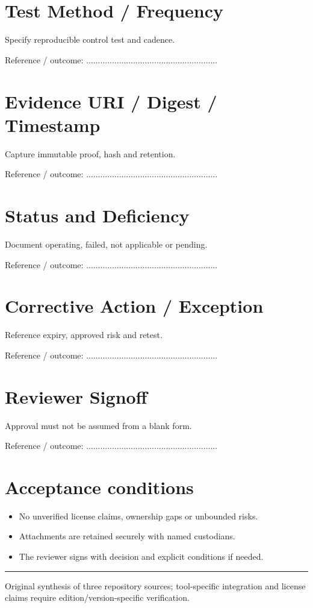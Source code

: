 \documentclass[10pt,letterpaper]{article}
\begin{document}
\section{Test Method / Frequency}
Specify reproducible control test and cadence.\par
Reference / outcome: ........................................................\par
\section{Evidence URI / Digest / Timestamp}
Capture immutable proof, hash and retention.\par
Reference / outcome: ........................................................\par
\section{Status and Deficiency}
Document operating, failed, not applicable or pending.\par
Reference / outcome: ........................................................\par
\section{Corrective Action / Exception}
Reference expiry, approved risk and retest.\par
Reference / outcome: ........................................................\par
\section{Reviewer Signoff}
Approval must not be assumed from a blank form.\par
Reference / outcome: ........................................................\par
\section{Acceptance conditions}
\begin{itemize}
\item No unverified license claims, ownership gaps or unbounded risks.
\item Attachments are retained securely with named custodians.
\item The reviewer signs with decision and explicit conditions if needed.
\end{itemize}
\vfill\noindent\color{muted}\rule{\linewidth}{0.4pt}\par\scriptsize Original synthesis of three repository sources; tool-specific integration and license claims require edition/version-specific verification.\normalsize
\end{document}
